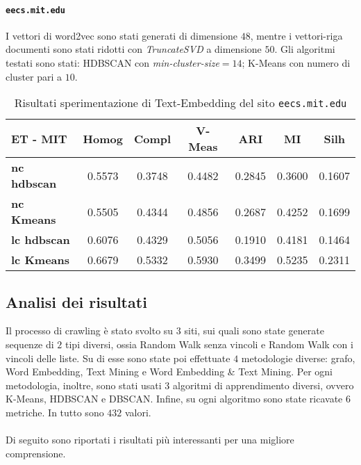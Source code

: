 \paragraph{\texttt{eecs.mit.edu}} I vettori di word2vec sono stati generati di dimensione $48$, mentre i vettori-riga documenti sono stati ridotti con \textit{TruncateSVD} a dimensione $50$. Gli algoritmi testati sono stati: HDBSCAN con \textit{min-cluster-size}$=14$; K-Means con numero di cluster pari a $10$. 


\begin{table}[H]
	\begin{tabular}{| l | c | c | c | c | c | c |}
	\hline
	\textbf{ET - MIT}  & \textbf{Homog} & \textbf{Compl} & \textbf{V-Meas}  & \textbf{ARI}  & \textbf{MI}  & \textbf{Silh} \\ [3ex] 
	\hline
	\textbf{nc hdbscan} & 0.5573 & 0.3748 & 0.4482 & 0.2845 & 0.3600 & 0.1607\\ [3ex]
	 \hline
	\textbf{nc Kmeans} & 0.5505 & 0.4344 & 0.4856 & 0.2687 & 0.4252 & 0.1699\\ [3ex]
	 \hline	
	\textbf{lc hdbscan} & 0.6076 & 0.4329 & 0.5056 & 0.1910 & 0.4181 & 0.1464\\ [3ex]
	\hline
	\textbf{lc Kmeans} & 0.6679 & 0.5332 & 0.5930 & 0.3499 & 0.5235 & 0.2311\\ [3ex]
	\hline
	\end{tabular}
	\caption{Risultati sperimentazione di Text-Embedding del sito \texttt{eecs.mit.edu}}
	\label{metricheTextEmbedMit}
\end{table}

\subsection{Analisi dei risultati}
Il processo di crawling è stato svolto su $3$ siti, sui quali sono state generate sequenze di $2$ tipi diversi, ossia Random Walk senza vincoli e Random Walk con i vincoli delle liste. Su di esse sono state poi effettuate $4$ metodologie diverse: grafo, Word Embedding, Text Mining e Word Embedding \& Text Mining. Per ogni metodologia, inoltre, sono stati usati $3$ algoritmi di apprendimento diversi, ovvero K-Means, HDBSCAN e DBSCAN. Infine, su ogni algoritmo sono state ricavate $6$ metriche. In tutto sono $432$ valori. 
\\\\
Di seguito sono riportati i risultati più interessanti per una migliore comprensione.

